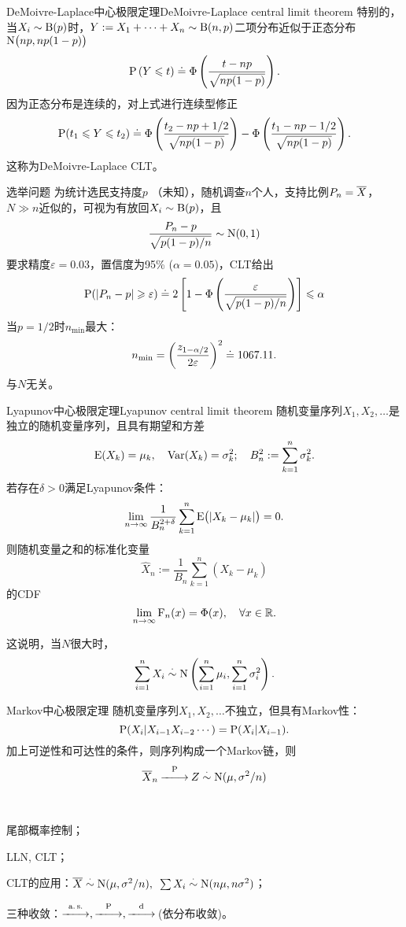 \begin{example}{DeMoivre-Laplace中心极限定理}{DeMoivre-Laplace central limit theorem}
	特别的，当$X_i\sim\Bern(p)$时，$Y:=X_1+\cdots+X_n\sim\Bern(n,p)$二项分布近似于正态分布$\Norm\bigkh{np,np(1-p)}$
	\[
		\P\kh{Y\leqslant t}\doteq\Phi\kh{\frac{t-np}{\sqrt{np(1-p)}}}.
	\]
	因为正态分布是连续的，对上式进行连续型修正
	\[
		\P(t_1\leqslant Y\leqslant t_2)\doteq\Phi\kh{\frac{t_2-np+1/2}{\sqrt{np(1-p)}}}-\Phi\kh{\frac{t_1-np-1/2}{\sqrt{np(1-p)}}}.
	\]
	这称为DeMoivre-Laplace CLT。
\end{example}
\begin{example}{选举问题}{}
	为统计选民支持度$p$ （未知），随机调查$n$个人，支持比例$P_n=\avg X$，$N\gg n$近似的，可视为有放回$X_i\sim\Bern(p)$，且
	\[
		\frac{P_n-p}{\sqrt{p(1-p)/n}}\sim\Norm(0,1)
	\]
	要求精度$\varepsilon=0.03$，置信度为95\% ($\alpha=0.05$)，CLT给出
	\[
		\P(|P_n-p|\geqslant\varepsilon)\doteq 2\fkh{1-\Phi\kh{\frac\varepsilon{\sqrt{p(1-p)/n}}}}\leqslant\alpha
	\]
	当$p=1/2$时$n_{\mathrm{min}}$最大：
	\[
		n_{\mathrm{min}}=\biggkh{\frac{z_{1-\alpha/2}}{2\varepsilon}}^2\doteq 1067.11.
	\]%
	与$N$无关。
\end{example}
\begin{theorem}{Lyapunov中心极限定理}{Lyapunov central limit theorem}
	随机变量序列$X_1,X_2,\ldots$是独立的随机变量序列，且具有期望和方差
	\[
		\E(X_k)=\mu_k,\quad\Var(X_k)=\sigma_k^2;\quad B_n^2:=\sum_{k=1}^n\sigma_k^2.
	\]
	若存在$\delta>0$满足Lyapunov条件：
	\[
		\lim_{n\to\infty}\frac1{B_n^{2+\delta}}\sum_{k=1}^n\E\bigkh{|X_k-\mu_k|}=0.
	\]
	则随机变量之和的标准化变量
	\[
		\hat X_n:=\frac1{B_n}\sum_{k=1}^n(X_k-\mu_k)
	\]
	的CDF
	\[
		\lim_{n\to\infty}\CDF_n(x)=\Phi(x),\quad\forall x\in\RR.
	\]
\end{theorem}
这说明，当$N$很大时，
\begin{align}
	\sum_{i=1}^nX_i\dotsim\Norm\kh{\sum_{i=1}^n\mu_i,\sum_{i=1}^n\sigma^2_i}.
\end{align}

\begin{theorem}{Markov中心极限定理}{}
	随机变量序列$X_1,X_2,\ldots$不独立，但具有Markov性：
	\[
		\P(X_i|X_{i-1}X_{i-2}\cdots)=\P(X_i|X_{i-1}).
	\]
	加上可逆性和可达性的条件，则序列构成一个Markov链，则
	\begin{align}
		\avg X_n\pto Z\dotsim\Norm(\mu,\sigma^2/n)
	\end{align}
\end{theorem}

\begin{remark}~
	\begin{compactenum}
		\item 尾部概率控制；
		\item LLN, CLT；
		\item CLT的应用：$\avg X\dotsim\Norm(\mu,\sigma^2/n),\enspace\sum X_i\dotsim\Norm(n\mu,n\sigma^2)$；
		\item 三种收敛：$\asto,\pto,\dto$\,(依分布收敛)。
	\end{compactenum}
\end{remark}
